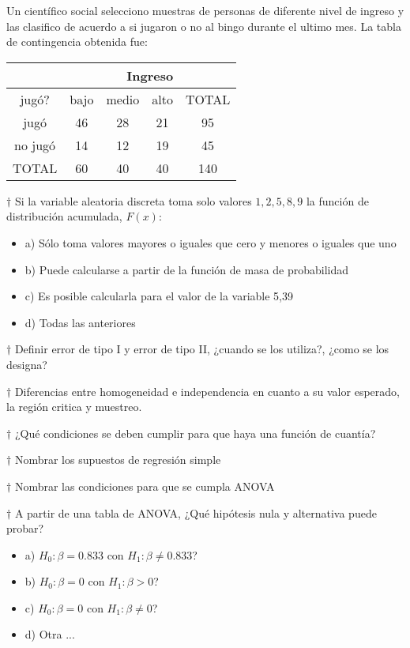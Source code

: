 \documentclass[10pt,a4paper]{article}
\begin{document}
Un científico social selecciono muestras de personas de diferente nivel de ingreso y las clasifico de acuerdo a si jugaron o no al bingo durante el ultimo mes. La tabla de contingencia obtenida fue:

\begin{center}
	\begin{tabular}{|c|c|c|c|c|}
		\hline 
		& \multicolumn{4}{c|}{Ingreso} \\ 
		\hline 
		jugó? & bajo & medio & alto & TOTAL \\ 
		\hline 
		jugó & 46 & 28 & 21 & 95 \\ 
		\hline 
		no jugó & 14 & 12 & 19 & 45 \\ 
		\hline 
		TOTAL & 60 & 40 & 40 & 140 \\ 
		\hline 
	\end{tabular} 
\end{center}

$\dagger$ Si la variable aleatoria discreta toma solo valores ${1,2,5,8,9}$ la función de distribución acumulada, $F(x)$:
\begin{itemize}
	\item a) Sólo toma valores mayores o iguales que cero y menores o iguales que uno
	\item b) Puede calcularse a partir de la función de masa de probabilidad
	\item c) Es posible calcularla para el valor de la variable 5,39
	\item d) Todas las anteriores
\end{itemize}

$\dagger$ Definir error de tipo I y error de tipo II, ¿cuando se los utiliza?, ¿como se los designa?

$\dagger$ Diferencias entre homogeneidad e independencia en cuanto a su valor esperado, la región critica y muestreo.

$\dagger$ ¿Qué condiciones se deben cumplir para que haya una función de cuantía?


$\dagger$ Nombrar los supuestos de regresión simple

$\dagger$ Nombrar las condiciones para que se cumpla ANOVA

$\dagger$ A partir de una tabla de ANOVA, ¿Qué hipótesis nula y alternativa puede probar?
\begin{itemize}
	\item a) $H_0 : \beta = 0.833$ con $H_1 : \beta \neq 0.833$?
	\item b) $H_0 : \beta = 0$ con $H_1 : \beta > 0$?
	\item c) $H_0 : \beta = 0$ con $H_1 : \beta \neq 0$?
	\item d) Otra ...
\end{itemize}
\end{document}
